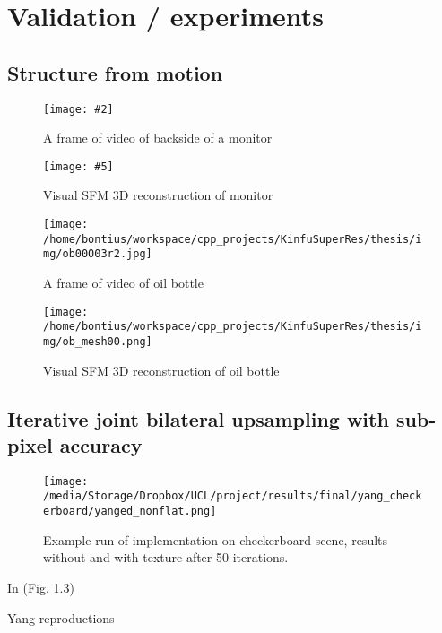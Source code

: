 \documentclass{ucl_thesis}
\newcommand{\myfig}[6]{%
\begin{figure}[h!]\centering%
	\begin{minipage}[b]{0.49\linewidth}\centering%
		\texttt{[image: \#2]}%
		\caption{#3}%
		\label{fig:#1}%
	\end{minipage}%
	\begin{minipage}[b]{0.49\linewidth}\centering%
		\texttt{[image: \#5]}%
		\caption{#6}%
		\label{fig:#4}%
	\end{minipage}%
\end{figure}%
}
\newcommand{\figref}[1]{(Fig. \ref{#1})}
\begin{document}
\chapter{Validation / experiments}
\label{chp:validation}

\section{Structure from motion} 
\label{sec:sfm}

\myfig
{acerlit_1}
{/home/bontius/workspace/cpp_projects/KinfuSuperRes/thesis/img/acer_lit00706.jpg}
{A frame of video of backside of a monitor}
{acerlit_mesh}
{/home/bontius/workspace/cpp_projects/KinfuSuperRes/thesis/img/acer_lit01.png}
{Visual SFM 3D reconstruction of monitor} 

\begin{figure}[h!]\centering
	\begin{minipage}[b]{0.49\linewidth}\centering
		\texttt{[image: /home/bontius/workspace/cpp\_projects/KinfuSuperRes/thesis/img/ob00003r2.jpg]}
		\caption{A frame of video of oil bottle}
		\label{fig:ob_1}
	\end{minipage}
	\begin{minipage}[b]{0.49\linewidth}\centering
		\texttt{[image: /home/bontius/workspace/cpp\_projects/KinfuSuperRes/thesis/img/ob\_mesh00.png]}
		\caption{Visual SFM 3D reconstruction of oil bottle}
		\label{fig:ob_mesh}
	\end{minipage}
\end{figure}

\section{Iterative joint bilateral upsampling with sub-pixel accuracy}
\label{sec:yang}

\begin{figure}[h!]\centering 
        \texttt{[image: /media/Storage/Dropbox/UCL/project/results/final/yang\_checkerboard/yanged\_nonflat.png]}        
        \caption{Example run of implementation on checkerboard scene, results without and with texture after 50 iterations.}
        \label{fig:yang_checkerboard}
\end{figure}

In \figref{fig:yang_checkerboard}

Yang reproductions
\end{document}
